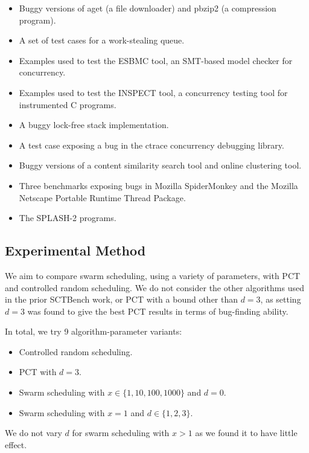 \begin{itemize}
\item Buggy versions of aget (a file downloader) and pbzip2 (a compression
program).
\item A set of test cases for a work-stealing queue.
\item Examples used to test the ESBMC tool\cite{cordeiro2011}, an SMT-based
model checker for concurrency.
\item Examples used to test the INSPECT tool\cite{yang2008}, a concurrency
testing tool for instrumented C programs.
\item A buggy lock-free stack implementation.
\item A test case exposing a bug in the ctrace\cite{mcpherson2003}
  concurrency debugging library.
\item Buggy versions of a content similarity search tool and online clustering
tool.
\item Three benchmarks exposing bugs in Mozilla
  SpiderMonkey\cite{eich1996} and the Mozilla Net\-scape Portable
  Runtime Thread Package\cite{mozilla1996}.
\item The SPLASH-2 programs\cite{woo1995}.
\end{itemize}

\subsection{Experimental Method}
\label{sec:algorithms-bench-method}

We aim to compare swarm scheduling, using a variety of parameters, with PCT and
controlled random scheduling.  We do not consider the other algorithms used in
the prior SCTBench work, or PCT with a bound other than $d=3$, as setting $d=3$ was
found to give the best PCT results in terms of bug-finding ability\cite{thomson2016}.

In total, we try 9 algorithm-parameter variants:

\begin{itemize}
\item Controlled random scheduling.
\item PCT with $d=3$.
\item Swarm scheduling with $x \in \{1,10,100,1000\}$ and $d=0$.
\item Swarm scheduling with $x=1$ and $d \in \{1,2,3\}$.
\end{itemize}

We do not vary $d$ for swarm scheduling with $x > 1$ as we found it to have
little effect.

